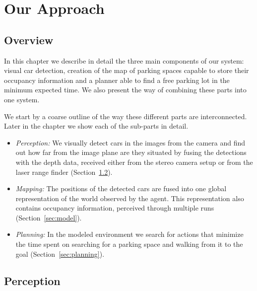 
\newcommand\Bx{x}
\newcommand\Bm{m}
\def\v{\vm{v}}
\newcommand\vm[1]{\bm{\mathrm{#1}}}
\renewcommand{\v}{{\mbox{a}^i}}
\newcommand{\z}{z_{t}}
\newcommand{\y}{z_{1:t-1}}

\chapter{Our Approach}
\label{cha:our_approach}

\section{Overview} %
\label{sec:overview}

In this chapter we describe in detail the three main components of our system:
visual car detection, creation of the map of parking spaces capable to store
their occupancy information and a planner able to find a free parking lot in
the minimum expected time. We also present the way of combining these parts
into one system.

We start by a coarse outline of the way these different parts are
interconnected. Later in the chapter we show each of the sub-parts in detail.

\begin{itemize}

\item \emph{Perception:} We visually detect cars in the images from the camera and find out how far from the image plane are they situated by fusing the detections with the depth data, received either from the stereo camera setup or from the laser range finder (Section~\ref{sec:perception}).

\item \emph{Mapping:} The positions of the detected cars are fused into one global representation of the world observed by the agent. This representation also contains occupancy information, perceived through multiple runs (Section~\ref{sec:model}).

\item \emph{Planning:} In the modeled environment we search for actions that minimize the time spent on searching for a parking space and walking from it to the goal (Section~\ref{sec:planning}).

\end{itemize}


\section{Perception} %
\label{sec:perception}

